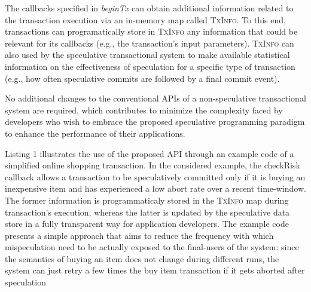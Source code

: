 The callbacks specified in \textit{beginTx} can obtain additional information related to the transaction execution via  an in-memory map called \textsc{TxInfo}. To this end, transactions can programatically store in \textsc{TxInfo}  any information that could be relevant for its callbacks (e.g., the transaction's input parameters). \textsc{TxInfo} can also used by the speculative transactional system to make available statistical information on the effectiveness of speculation for a specific type of transaction (e.g., how often speculative commits are followed by a final commit event).


No additional changes to the conventional APIs of a non-speculative transactional system are required, which contributes to minimize the complexity faced by developers who wish to embrace the proposed speculative programming paradigm to enhance the performance of their applications. 




Listing 1 illustrates the use of the proposed API through an example code of a simplified online shopping transaction. In the considered example, the checkRisk callback allows a transaction to be speculatively committed only if it is buying an inexpensive item and has experienced a low abort rate over a recent time-window. The former information is programmaticaly stored  in the \textsc{TxInfo} map during transaction's execution, whereas the latter is updated by the speculative data store in a fully transparent way for application developers. The example code presents a simple approach that aims to reduce the frequency with which mispeculation need to be actually exposed to the final-users of the system: since the semantics of buying an item does not change during different runs, the system can just retry a few times the buy item transaction if it gets aborted after speculation



